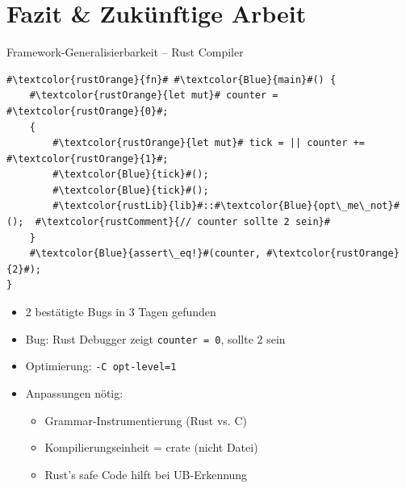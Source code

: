 ﻿\documentclass{beamer}
\begin{document}
\section{Fazit \& Zuk\"unftige Arbeit}


\begin{frame}[fragile]{Framework-Generalisierbarkeit -- Rust Compiler}
  \begin{lstlisting}[basicstyle=\ttfamily\tiny,escapechar=\#]
#\textcolor{rustOrange}{fn}# #\textcolor{Blue}{main}#() {
    #\textcolor{rustOrange}{let mut}# counter = #\textcolor{rustOrange}{0}#;
    {
        #\textcolor{rustOrange}{let mut}# tick = || counter += #\textcolor{rustOrange}{1}#;
        #\textcolor{Blue}{tick}#();
        #\textcolor{Blue}{tick}#();
        #\textcolor{rustLib}{lib}#::#\textcolor{Blue}{opt\_me\_not}#();  #\textcolor{rustComment}{// counter sollte 2 sein}#
    }
    #\textcolor{Blue}{assert\_eq!}#(counter, #\textcolor{rustOrange}{2}#);
}
  \end{lstlisting}
  \begin{itemize}
    \item 2 best\"atigte Bugs in 3 Tagen gefunden
    \item Bug: Rust Debugger zeigt \texttt{counter = 0}, sollte 2 sein
    \item Optimierung: \texttt{-C opt-level=1}
    \item Anpassungen n\"otig:
      \begin{itemize}
        \item Grammar-Instrumentierung (Rust vs. C)
        \item Kompilierungseinheit = crate (nicht Datei)
        \item Rust's safe Code hilft bei UB-Erkennung
      \end{itemize}
  \end{itemize}
\end{frame}
\end{document}
